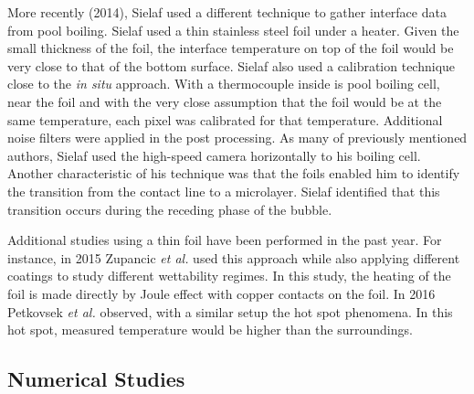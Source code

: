 
\par More recently (2014), Sielaf \cite{sielaff2014experimental} used a different technique to gather interface data from pool boiling. Sielaf used a thin stainless steel foil under a heater. Given the small thickness of the foil, the interface temperature on top of the foil would be very close to that of the bottom surface. Sielaf also used a calibration technique close to the \textit{in situ} approach. With a thermocouple inside is pool boiling cell, near the foil and with the very close assumption that the foil would be at the same temperature, each pixel was calibrated for that temperature. Additional noise filters were applied in the post processing. As many of previously mentioned authors, Sielaf used the high-speed camera horizontally to his boiling cell. Another characteristic of his technique was that the foils enabled him to identify the transition from the contact line to a microlayer. Sielaf identified that this transition occurs during the receding phase of the bubble. \\

\par Additional studies using a thin foil have been performed in the past year. For instance, in 2015 Zupancic \textit{et al.} used this approach while also applying different coatings to study different wettability regimes. In this study, the heating of the foil is made directly by Joule effect with copper contacts on the foil. In 2016 Petkovsek \textit{et al.} observed, with a similar setup the hot spot phenomena. In this hot spot, measured temperature would be higher than the surroundings. \\

\subsection{Numerical Studies}

